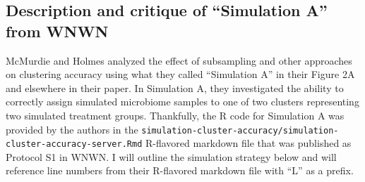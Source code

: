 \documentclass[
]{article}
\begin{document}
\hypertarget{description-and-critique-of-simulation-a-from-wnwn}{%
\subsection{Description and critique of ``Simulation A'' from
WNWN}\label{description-and-critique-of-simulation-a-from-wnwn}}

McMurdie and Holmes analyzed the effect of subsampling and other
approaches on clustering accuracy using what they called ``Simulation
A'' in their Figure 2A and elsewhere in their paper. In Simulation A,
they investigated the ability to correctly assign simulated microbiome
samples to one of two clusters representing two simulated treatment
groups. Thankfully, the R code for Simulation A was provided by the
authors in the
\texttt{simulation-cluster-accuracy/simulation-cluster-accuracy-server.Rmd}
R-flavored markdown file that was published as Protocol S1 in WNWN. I
will outline the simulation strategy below and will reference line
numbers from their R-flavored markdown file with ``L'' as a prefix.
\end{document}
